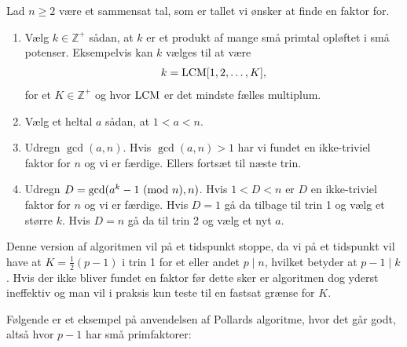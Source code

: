 \begin{algorithm}
Lad $n \geq 2$ være et sammensat tal, som er tallet vi ønsker at 
finde en faktor for.
\begin{enumerate}
	\item Vælg $k \in \mathbb{Z}^+$ sådan, at $k$ er et produkt
	af mange små primtal opløftet i små potenser. Eksempelvis kan $k$ vælges til at være
	\begin{align*}
		k = \mathrm{LCM} [1, 2, \ldots, K],
	\end{align*}
	for et $K \in \mathbb{Z}^+$ og hvor $\mathrm{LCM}$ er det mindste fælles multiplum.
	\item Vælg et heltal $a$ sådan, at $1 < a <n$.
	\item Udregn $\gcd(a, n)$. Hvis $\gcd(a, n) > 1$ har vi fundet en
	ikke-triviel faktor for $n$ og vi er færdige. Ellers fortsæt til næste
	trin.
	\item Udregn $D = \gcd(a^k - 1 \ (\mathrm{mod} \ n), n)$. Hvis $1 < D < n$ er $D$ en ikke-triviel
	faktor for $n$ og vi er færdige. Hvis $D = 1$ gå da tilbage til trin 1
	og vælg et større $k$. Hvis $D = n$ gå da til trin 2 og vælg et nyt $a$. 
\end{enumerate}
\end{algorithm}

Denne version af algoritmen vil på et tidspunkt stoppe, da vi på et tidspunkt vil have at $K=\frac{1}{2}(p-1)$ i trin 1 for et eller andet $p \mid n$, hvilket betyder at $p-1 \mid k$. Hvis der ikke bliver fundet en faktor før dette sker er algoritmen dog yderst ineffektiv og man vil i praksis kun teste til en fastsat grænse for $K$.

Følgende er et eksempel på anvendelsen af Pollards algoritme,
hvor det går godt, altså hvor $p-1$ har små primfaktorer:


